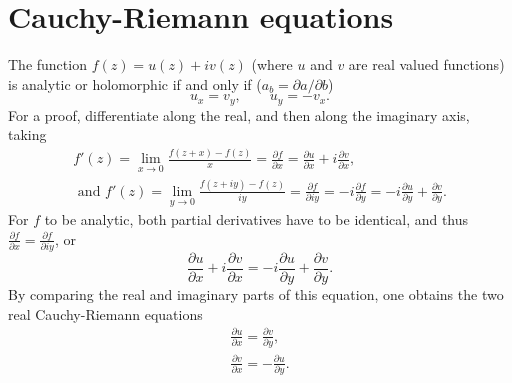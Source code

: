  \section{Cauchy-Riemann equations}
 The function $f(z)=u(z)+iv(z)$ (where $u$ and $v$ are real valued functions) is
 {analytic or holomorphic} if and only if
 ($a_b=\partial a/\partial b$)
 \begin{equation}
u_x=v_y, \qquad u_y=-v_x .
\end{equation}
{\color{OliveGreen}
\bproof
For a proof, differentiate along the real, and then along the imaginary axis,
taking
\begin{equation}
\begin{split}
f'(z) =\lim_{x\rightarrow 0}\frac{f(z+x)-f(z)}{x}=\frac{\partial f}{\partial x}=   \frac{\partial u}{\partial x}+i\frac{\partial v}{\partial x},\\
\textrm { and } f'(z) =\lim_{y\rightarrow 0}\frac{f(z+iy)-f(z)}{iy}=\frac{\partial f}{\partial iy}= -i\frac{\partial f}{\partial y}=   -i\frac{\partial u}{\partial y}+ \frac{\partial v}{\partial y}.
\end{split}
\end{equation}
For $f$ to be analytic, both partial derivatives have to be identical, and thus $\frac{\partial f}{\partial x}=\frac{\partial f}{\partial iy}$, or
\begin{equation}
\frac{\partial u}{\partial x}+i\frac{\partial v}{\partial x}=   -i\frac{\partial u}{\partial y}+ \frac{\partial v}{\partial y}.
\end{equation}
By comparing the real and imaginary parts of this equation, one obtains the two real Cauchy-Riemann equations
\begin{equation}
\begin{split}
\frac{\partial u}{\partial x}=   \frac{\partial v}{\partial y},\\
\frac{\partial v}{\partial x}=   -\frac{\partial u}{\partial y}.
\end{split}
\end{equation}
\eproof
}


